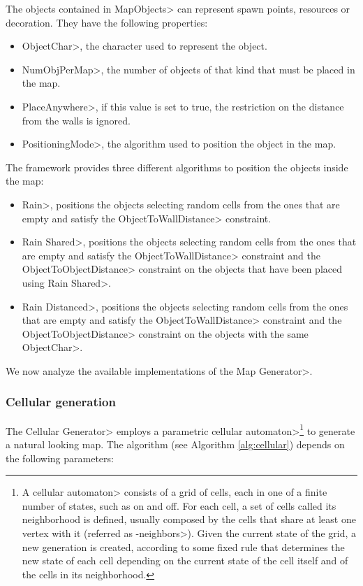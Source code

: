 The objects contained in \<MapObjects> can represent spawn points, resources or decoration. They have the following properties:

\begin{itemize}
\item \<ObjectChar>, the character used to represent the object.
\item \<NumObjPerMap>,  the number of objects of that kind that must be placed in the map.
\item \<PlaceAnywhere>, if this value is set to true, the restriction on the distance from the walls is ignored.
\item \<PositioningMode>, the algorithm used to position the object in the map.
\end{itemize}

The framework provides three different algorithms to position the objects inside the map:

\begin{itemize}
\item \<Rain>, positions the objects selecting random cells from the ones that are empty and satisfy the  \<ObjectToWallDistance> constraint.
\item \<Rain Shared>, positions the objects selecting random cells from the ones that are empty and satisfy the  \<ObjectToWallDistance> constraint and the \<ObjectToObjectDistance> constraint on the objects that have been placed using \<Rain Shared>.
\item \<Rain Distanced>, positions the objects selecting random cells from the ones that are empty and satisfy the  \<ObjectToWallDistance> constraint and the \<ObjectToObjectDistance> constraint on the objects with the same \<ObjectChar>.
\end{itemize}

We now analyze the available implementations of the  \<Map Generator>.

\subsubsection{Cellular generation}

The \<Cellular Generator> employs a parametric \<cellular automaton>\footnote{A \<cellular automaton> consists of a grid of cells, each in one of a finite number of states, such as on and off. For each cell, a set of cells called its neighborhood is defined, usually composed by the cells that share at least one vertex with it (referred as -neighbors>). Given the current state of the grid, a new generation is created, according to some fixed rule that determines the new state of each cell depending on the current state of the cell itself and of the cells in its neighborhood.} to generate a natural looking map. The algorithm (see Algorithm \ref{alg:cellular}) depends on the following parameters:

